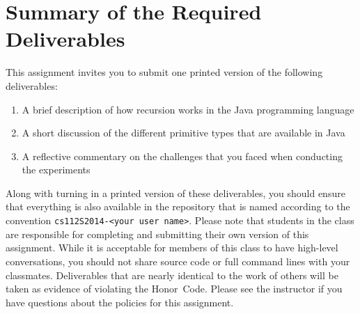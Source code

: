 \section*{Summary of the Required Deliverables}

  This assignment invites you to submit one printed version of the following deliverables: 

  \begin{enumerate} 

  \item A brief description of how recursion works in the Java programming language

  \item A short discussion of the different primitive types that are available in Java

  \item A reflective commentary on the challenges that you faced when conducting the experiments
   
  \end{enumerate}

  Along with turning in a printed version of these deliverables, you should ensure that everything is also available in
  the repository that is named according to the convention {\tt cs112S2014-<your user name>}. Please note that students
  in the class are responsible for completing and submitting their own version of this assignment.    While it is
  acceptable for members of this class to have high-level conversations, you should not share source code or full
  command lines with your classmates.  Deliverables that are nearly identical to the work of others will be taken as
  evidence of violating the \mbox{Honor Code}.  Please see the instructor if you have questions about the policies for
  this assignment.

  
